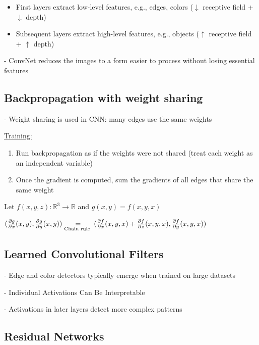 \begin{itemize}
  \item First layers extract low-level features, e.g., edges, colors ($\downarrow$ receptive field + $\downarrow$ depth)
  \item Subsequent layers extract high-level features, e.g., objects ($\uparrow$ receptive field + $\uparrow$ depth)
\end{itemize}

- ConvNet reduces the images to a form easier to process without losing essential features

\subsection*{Backpropagation with weight sharing}
- Weight sharing is used in CNN: many edges use the same weights

\underline{Training:}

\begin{enumerate}
  \item Run backpropagation as if the weights were not shared (treat each weight as an independent variable)

  \item Once the gradient is computed, sum the gradients of all edges that share the same weight

\end{enumerate}

Let $f(x, y, z): \mathbb{R}^{3} \rightarrow \mathbb{R}$ and $g(x, y)=f(x, y, x)$

$
(\frac{\partial g}{\partial x}(x, y), \frac{\partial g}{\partial y}(x, y)) \\\underset{\text {Chain rule }}{=}(\frac{\partial f}{\partial x}(x, y, x)+\frac{\partial f}{\partial z}(x, y, x), \frac{\partial f}{\partial y}(x, y, x))
$

\subsection*{Learned Convolutional Filters}

- Edge and color detectors typically emerge when trained on large datasets

- Individual Activations Can Be Interpretable

- Activations in later layers detect more complex patterns

\subsection*{Residual Networks}
